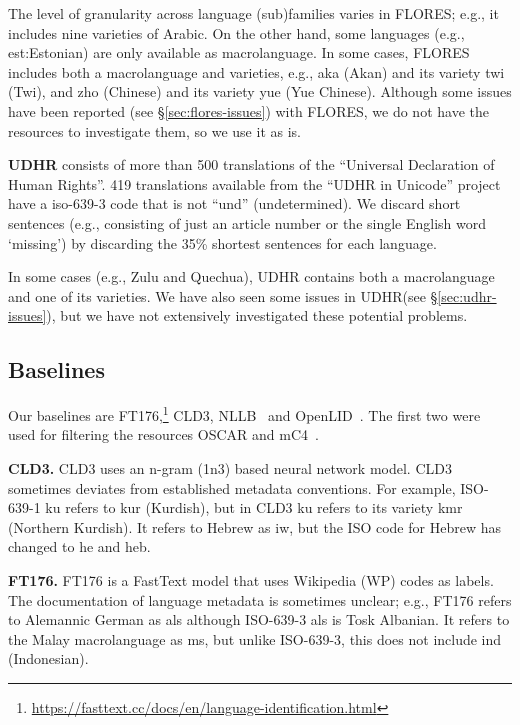 \documentclass[11pt]{article}
\def\macrolanguage{macrolanguage\xspace}
\def\flores{FLORES\xspace}
\def\udhr{UDHR\xspace}
\def\ft176{FT176\xspace}
\def\edin{OpenLID\xspace}
\def\nllb{NLLB\xspace}
\def\seclabel#1{\label{sec:#1}\label{p:#1}}
\def\secref#1{\S\ref{sec:#1}}
\begin{document}
The level of granularity
across language (sub)families varies in \flores; e.g.,
it
includes nine varieties of Arabic.
On the other hand, some languages (e.g., 
est:Estonian) are only
available as \macrolanguage.
In some cases, \flores includes
both a \macrolanguage and varieties, e.g.,
 aka
(Akan) and its variety twi (Twi), and zho (Chinese) and its
variety yue (Yue Chinese).
Although some issues have been reported
(see \secref{flores-issues}) with \flores, we do
not have the resources to investigate them, so we
use it as is.



\textbf{\udhr}
consists of more than 500 translations of the
``Universal Declaration of Human Rights''.
419 translations available from the ``UDHR in Unicode'' project have a
iso-639-3 code that is not ``und'' (undetermined). 
We discard short
sentences (e.g., consisting
of just an article number or the single English word ‘missing’) by discarding the 35\% shortest
sentences for each language.

In some cases (e.g., Zulu and Quechua), UDHR
contains both a macrolanguage and one of its varieties. We have also seen some issues in \udhr (see \secref{udhr-issues}), but we have not extensively investigated these potential problems.


\subsection{Baselines}\seclabel{baselines}
Our baselines are \ft176,\footnote{\url{https://fasttext.cc/docs/en/language-identification.html}} CLD3, \nllb~\cite{nllbteam2022language} and \edin~\cite{burchell-etal-2023-open}. The first two were used for filtering
the resources OSCAR and
mC4~\cite{kreutzer-etal-2022-quality}.

\textbf{CLD3.} CLD3 uses an n-gram (1n3)
based neural network model. CLD3 sometimes deviates from established
metadata conventions. For example, ISO-639-1 ku refers
to kur (Kurdish), but in CLD3 ku refers to its variety kmr (Northern Kurdish). It refers to Hebrew as iw, but the ISO code for Hebrew has changed to he and heb.

\textbf{\ft176.}
\ft176 
 is a FastText model
that uses
Wikipedia (WP) codes  as labels.
The documentation of language metadata is sometimes unclear;
e.g.,
\ft176 refers to Alemannic German as als although
ISO-639-3 als is Tosk Albanian.
It refers to the Malay \macrolanguage as ms, but unlike
ISO-639-3, this does not include ind (Indonesian).
\end{document}
